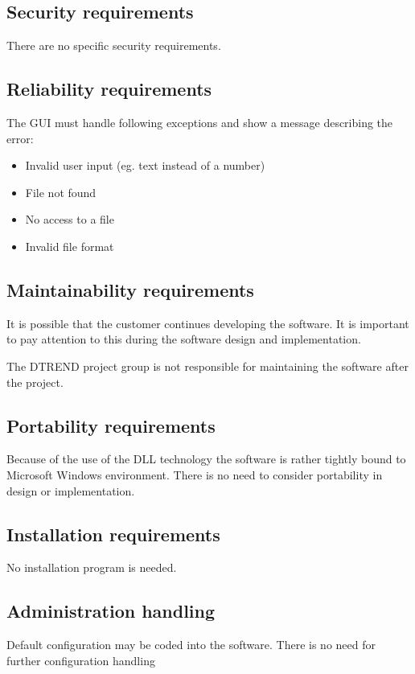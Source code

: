 \documentclass[a4paper,11pt]{article}
\begin{document}
\subsection{Security requirements}

There are no specific security requirements.

\subsection{Reliability requirements}
\label{sec:reliability}
The GUI must handle following exceptions and show a message describing the error:
\begin{itemize}
\item Invalid user input (eg. text instead of a number)
\item File not found
\item No access to a file
\item Invalid file format
\end{itemize}

\subsection{Maintainability requirements}

It is possible that the customer continues developing the software. It is important to pay attention to this during
the software design and implementation.

The DTREND project group is not responsible for maintaining the software after the project.

\subsection{Portability requirements}

Because of the use of the DLL technology the software is rather tightly bound to Microsoft Windows environment. There is
no need to consider portability in design or implementation.

\subsection{Installation requirements}
No installation program is needed.

\subsection{Administration handling}
Default configuration may be coded into the software. There is no need for further configuration handling
\end{document}
